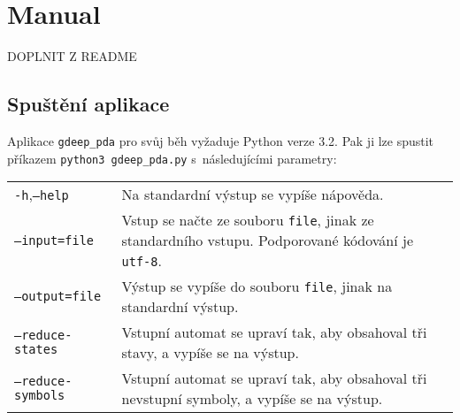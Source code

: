 \chapter{Manual}

DOPLNIT Z README

\section{Spuštění aplikace}

Aplikace \texttt{gdeep\_pda} pro svůj běh vyžaduje Python verze 3.2. Pak ji lze spustit příkazem \texttt{python3 gdeep\_pda.py} s~následujícími parametry:

\begin{tabular}{l p{10cm}}\\
\texttt{-h},\texttt{--help} 	& Na standardní výstup se vypíše nápověda. \\
\texttt{--input=file}   	& Vstup se načte ze souboru \texttt{file}, jinak ze standardního vstupu. Podporované kódování je \texttt{utf-8}.\\
\texttt{--output=file}  	& Výstup se vypíše do souboru \texttt{file}, jinak na standardní výstup.	\\
\texttt{--reduce-states} 	& Vstupní automat se upraví tak, aby obsahoval tři stavy, a vypíše se na výstup. \\
\texttt{--reduce-symbols} 	& Vstupní automat se upraví tak, aby obsahoval tři nevstupní symboly, a vypíše se na výstup.
\end{tabular}





